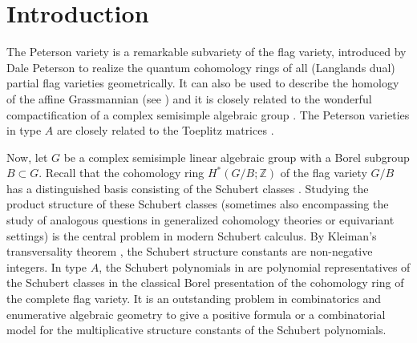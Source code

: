 \documentclass[11pt, letterpaper]{amsart}
\numberwithin{equation}{section}
\begin{document}
\setcounter{tocdepth}{2}

\section{Introduction}
The Peterson variety is a remarkable subvariety of the flag variety, introduced by Dale Peterson \cite{peterson1997quantum} to realize the quantum cohomology rings of all (Langlands dual) partial flag varieties geometrically. It can also be used to describe the homology of the affine Grassmannian (see \cite{lam2010quantum}) and it is closely related to the wonderful compactification of a complex semisimple algebraic group \cite{Bualibanu2017Peterson}.
The Peterson varieties in type $A$ are closely related to the Toeplitz matrices \cite{rietsch2003totally}.

Now, let \( G \) be a complex semisimple linear algebraic group with a Borel subgroup \( B \subset G \). Recall that the cohomology ring $H^*(G/B; \mathbb{Z})$ of the flag variety $G/B$ has a distinguished basis consisting of the Schubert classes \cite{bernstein1973schubert}. Studying the product structure of these Schubert classes (sometimes also encompassing the study of analogous questions in generalized cohomology theories or equivariant settings) is the central problem in modern Schubert calculus. By Kleiman's transversality theorem \cite{kleiman1974transversality}, the Schubert structure constants are non-negative integers. In type $A$, the Schubert polynomials in \cite{Lascoux} are polynomial representatives of the Schubert classes in the classical Borel presentation \cite{borel1953cohomologie} of the cohomology ring of the complete flag variety. It is an outstanding problem in combinatorics and enumerative algebraic geometry to give a positive formula or a combinatorial model for the multiplicative structure constants of the Schubert polynomials.
\end{document}
